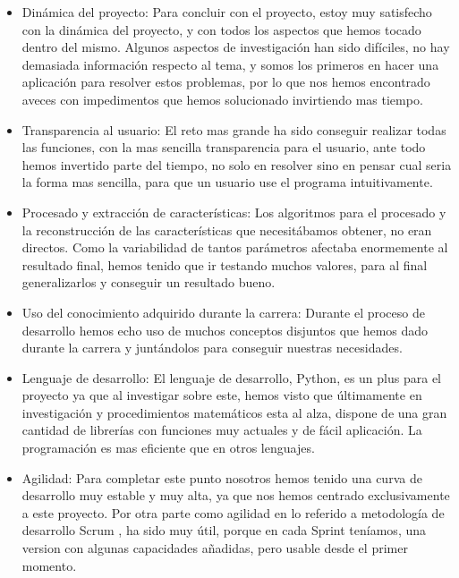 \begin{itemize}
\item Dinámica del proyecto: Para concluir con el proyecto, estoy muy satisfecho con la dinámica del proyecto, y con todos los aspectos que hemos tocado dentro del mismo.
Algunos aspectos de investigación han sido difíciles, no hay demasiada información respecto al tema, y somos los primeros en hacer una aplicación para resolver estos problemas, por lo que nos hemos encontrado aveces con impedimentos que hemos solucionado invirtiendo mas tiempo.

\item Transparencia al usuario: El reto mas grande ha sido conseguir realizar todas las funciones, con la mas sencilla transparencia para el usuario, ante todo hemos invertido parte del tiempo, no solo en resolver sino en pensar cual seria la forma mas sencilla, para que un usuario use el programa intuitivamente. 
\item Procesado y extracción de características: Los algoritmos para el procesado y la reconstrucción de las características que necesitábamos obtener, no eran directos. Como la variabilidad de tantos parámetros afectaba enormemente al resultado final, hemos tenido que ir testando muchos valores, para al final generalizarlos y conseguir un resultado bueno.

\item Uso del conocimiento adquirido durante la carrera: Durante el proceso de desarrollo hemos echo uso de muchos conceptos disjuntos que hemos dado durante la carrera y juntándolos para conseguir nuestras necesidades.

\item Lenguaje de desarrollo: El lenguaje de desarrollo, Python, es un plus para el proyecto ya que al investigar sobre este, hemos visto que últimamente en investigación y procedimientos matemáticos esta al alza, dispone de una gran cantidad de librerías con funciones muy actuales y de fácil aplicación. La programación es mas eficiente que en otros lenguajes.

\item Agilidad: Para completar este punto nosotros hemos tenido una curva de desarrollo muy estable y muy alta, ya que nos hemos centrado exclusivamente a este proyecto.
Por otra parte como agilidad en lo referido a metodología de desarrollo Scrum \cite{Scrum}, ha sido muy útil, porque en cada Sprint teníamos, una version con algunas capacidades añadidas, pero usable desde el primer momento.


\end{itemize}
